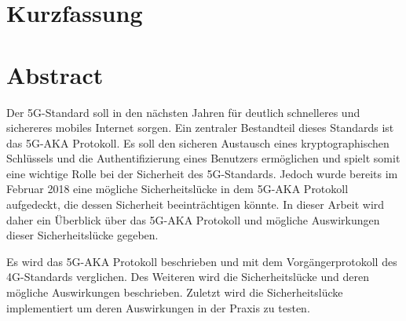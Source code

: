 \ifdeutsch
  \section*{Kurzfassung}
\else
  \section*{Abstract}
\fi

Der 5G-Standard soll in den nächsten Jahren für deutlich schnelleres und sichereres mobiles Internet sorgen.
Ein zentraler Bestandteil dieses Standards ist das 5G-AKA Protokoll.
Es soll den sicheren Austausch eines kryptographischen Schlüssels und die Authentifizierung eines Benutzers ermöglichen und spielt somit eine wichtige Rolle bei der Sicherheit des 5G-Standards.
Jedoch wurde bereits im Februar 2018 eine mögliche Sicherheitslücke in dem 5G-AKA Protokoll aufgedeckt, die dessen Sicherheit beeinträchtigen könnte.
In dieser Arbeit wird daher ein Überblick über das 5G-AKA Protokoll und mögliche Auswirkungen dieser Sicherheitslücke gegeben.

Es wird das 5G-AKA Protokoll beschrieben und mit dem Vorgängerprotokoll des 4G-Standards verglichen.
Des Weiteren wird die Sicherheitslücke und deren mögliche Auswirkungen beschrieben.
Zuletzt wird die Sicherheitslücke implementiert um deren Auswirkungen in der Praxis zu testen.
